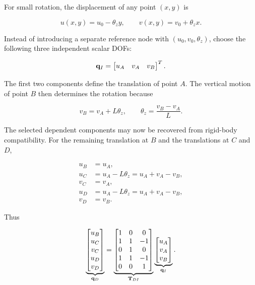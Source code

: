 For small rotation, the displacement of any point $(x,y)$ is

\begin{equation}\label{rbe1-planar-rigid-motion}
    u(x,y)=u_0-\theta_z y,
    \qquad
    v(x,y)=v_0+\theta_z x.
\end{equation}

Instead of introducing a separate reference node with
$(u_0,v_0,\theta_z)$, choose the following three independent scalar DOFs:

\begin{equation}\label{rbe1-planar-independent-set}
    \mathbf{q}_I=
    \begin{bmatrix}
        u_A & v_A & v_B
    \end{bmatrix}^T.
\end{equation}

The first two components define the translation of point $A$. The vertical
motion of point $B$ then determines the rotation because

\begin{equation}
    v_B=v_A+L\theta_z,
    \qquad
    \theta_z=\frac{v_B-v_A}{L}.
\end{equation}

The selected dependent components may now be recovered from rigid-body
compatibility. For the remaining translation at $B$ and the translations at
$C$ and $D$,

\begin{align}
    u_B &= u_A, \\
    u_C &= u_A-L\theta_z = u_A+v_A-v_B, \\
    v_C &= v_A, \\
    u_D &= u_A-L\theta_z = u_A+v_A-v_B, \\
    v_D &= v_B.
\end{align}

Thus

\begin{equation}\label{rbe1-planar-transformation}
    \underbrace{
    \begin{bmatrix}
        u_B\\
        u_C\\
        v_C\\
        u_D\\
        v_D
    \end{bmatrix}}_{\mathbf{q}_D}
    =
    \underbrace{
    \begin{bmatrix}
        1 & 0 & 0\\
        1 & 1 & -1\\
        0 & 1 & 0\\
        1 & 1 & -1\\
        0 & 0 & 1
    \end{bmatrix}}_{\mathbf{T}_{DI}}
    \underbrace{
    \begin{bmatrix}
        u_A\\
        v_A\\
        v_B
    \end{bmatrix}}_{\mathbf{q}_I}.
\end{equation}


